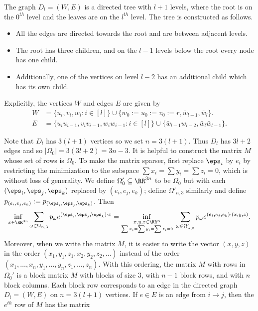 \begin{dfn}\label{dfn:graph}
The graph $D_l = (W,E)$ is a directed tree with $l + 1$ levels, where the root is on the $0^{th}$ level and the leaves are on the $l^{th}$ level. The tree is constructed as follows.
\begin{itemize}
\item All the edges are directed towards the root and are between adjacent levels. 
\item The root has three children, and on the $l-1$ levels below the root every node has one child. 
\item Additionally, one of the vertices on level $l-2$ has an additional child which has its own child. 
\end{itemize}
Explicitly, the vertices $W$ and edges $E$ are given by
\begin{align*}W &= \{u_i, v_i, w_i: i \in [l]\} \cup \{w_0:=u_0:=v_0:=r, \bar{w}_{l-1}, \bar{w}_l\}.\\
 E &= \{u_{i}u_{i-1}, v_{i}v_{i-1}, w_{i}w_{i-1}: i \in [l] \} \cup \{\bar{w}_{l-1} w_{l-2}, \bar{w}_l \bar{w}_{l-1}\}.\end{align*}
\end{dfn}
Note that $D_l$ has $3(l + 1)$ vertices so we set $n = 3(l + 1)$. Thus $D_l$ has $3 l + 2$ edges and so $|\Omega_0| = 3(3l + 2) = 3n - 3.$ It is helpful to construct the matrix $M$ whose set of rows is $\Omega_0$. To make the matrix sparser, first replace $\eps_i$ by $e_i$ by restricting the minimization to the subspace $\sum x_i = \sum y_i = \sum z_i = 0$, which is without loss of generality. We define $\Omega_0' \subseteq \RR^{3n}$ to be $\Omega_0$ but with each $(\eps_i, \eps_j, \eps_k)$ replaced by $(e_i, e_j, e_k)$; define $\Omega'_{n,3}$ similarly and define $p_{(e_i, e_j, e_k)}:=p_{(\eps_i, \eps_j, \eps_k)}$. Then
$$ \inf_{x \in \RR^{3n}} \sum_{\omega \in \Omega_{n,3}} p_{\omega} e^{(\eps_i, \eps_j, \eps_k) \cdot x} =  \inf_{\underset{\sum x_i = \sum y_i = \sum z_i = 0}{x,y,z \in \RR^{n}}} \;\sum_{\omega \in \Omega'_{n,3}} p_{\omega} e^{(e_i, e_j, e_k) \cdot (x,y,z)}.$$
 Moreover, when we write the matrix $M$, it is easier to write the vector $(x,y,z)$ in the order $(x_1,y_1,z_1, x_2,y_2,z_2, \dots )$ instead of the order $(x_1, \dots, x_n, y_1, \dots, y_n, z_1, \dots, z_n)$. With this ordering, the matrix $M$ with rows in $\Omega_0'$ is a block matrix $M$ with blocks of size $3$, with $n-1$ block rows, and with $n$ block columns. Each block row corresponds to an edge in the directed graph $D_l = (W, E)$ on $n = 3(l+1)$ vertices. If $e \in E$ is an edge from $i \to j$, then the $e^{th}$ row of $M$ has the matrix 
